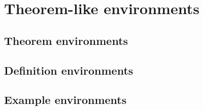 \documentclass[xetex]{beamer}
\newcounter{ct}
\begin{document}
	
	\section{Theorem-like environments}
	\subsection{Theorem environments}
	\subsection{Definition environments}
	
	\subsection{Example environments}
		
\end{document}
